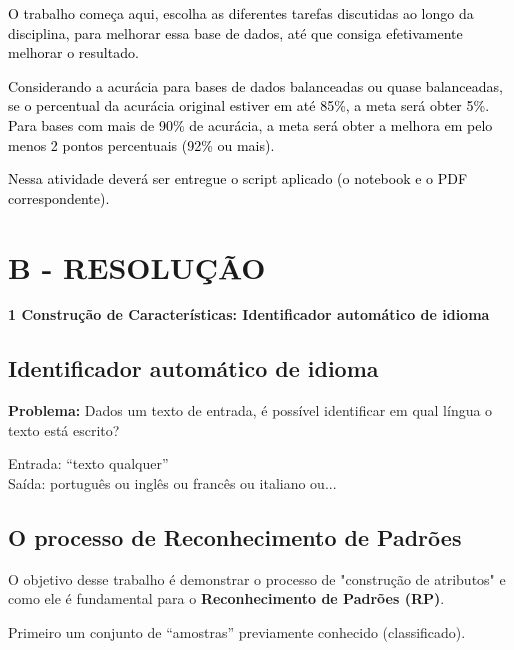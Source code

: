 \textcolor{black}{O trabalho começa aqui, escolha as diferentes tarefas discutidas ao longo da disciplina, para melhorar
essa base de dados, até que consiga efetivamente melhorar o resultado.}



\textcolor{black}{Considerando a acurácia para bases de dados balanceadas ou quase balanceadas, se o percentual da
acurácia original estiver em até 85\%, a meta será obter 5\%. Para bases com mais de 90\% de acurácia, a meta será
obter a melhora em pelo menos 2 pontos percentuais (92\% ou mais).}



\textcolor{black}{Nessa atividade deverá ser entregue o script aplicado (o notebook e o PDF correspondente).}



\section*{\textbf{B - RESOLUÇÃO}}
\begin{adjustwidth}{1em}{}
\textbf{1 Construção de Características: Identificador automático de idioma}
\end{adjustwidth}

\subsection*{\textbf{Identificador automático de idioma}}
\textbf{Problema:} Dados um texto de entrada, é possível identificar em qual língua o texto está escrito?

Entrada: ``texto qualquer''\\
\indent Saída: português ou inglês ou francês ou italiano ou...

\subsection*{\textbf{O processo de Reconhecimento de Padrões}}
O objetivo desse trabalho é demonstrar o processo de "construção de atributos" e como ele é fundamental para o \textbf{Reconhecimento de Padrões (RP)}.

Primeiro um conjunto de ``amostras'' previamente conhecido (classificado).


